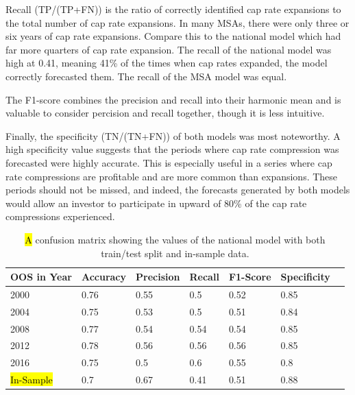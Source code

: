 \documentclass[jrfm,article,accept,oneauthor,pdftex]{Definitions/mdpi}
\begin{document}
Recall (TP/(TP+FN)) is the ratio of correctly identified cap rate expansions to the total number of cap rate expansions. In many MSAs, there were only three or six years of cap rate expansions. Compare this to the national model which had far more quarters of cap rate expansion. The recall of the national model was high at 0.41, meaning 41\% of the times when cap rates expanded, the model correctly forecasted them. The recall of the MSA model was equal.

The F1-score combines the precision and recall into their harmonic mean and is valuable to consider percision and recall together, though it is less intuitive. 

Finally, the specificity (TN/(TN+FN)) of both models was most noteworthy. A high specificity value suggests that the periods where cap rate compression was forecasted were highly accurate. This is especially useful in a series where cap rate compressions are profitable and are more common than expansions. These periods should not be missed, and indeed, the forecasts generated by both models would allow an investor to participate in upward of 80\% of the cap rate compressions experienced.


\begin{table}[H]
\tabcolsep=0.345cm
  \caption{\hl{A} %
 confusion matrix showing the values of the national model with both train/test split and in-sample data.}
    \begin{tabular}{lllllll}
    \toprule
    \textbf{OOS in Year }& {\textbf{Accuracy}} & {\textbf{Precision}} & {\textbf{Recall}} & {\textbf{F1-Score}} & {\textbf{Specificity}} &  \\
    \midrule
    {2000} & 0.76  & 0.55  & 0.5   & 0.52  & 0.85  &  \\
    {2004} & 0.75  & 0.53  & 0.5   & 0.51  & 0.84  &  \\
    {2008} & 0.77  & 0.54  & 0.54  & 0.54  & 0.85  &  \\
    {2012} & 0.78  & 0.56  & 0.56  & 0.56  & 0.85  &  \\
    {2016} & 0.75  & 0.5   & 0.6   & 0.55  & 0.8   &  \\
    \hl{In-Sample} %
 & 0.7   & 0.67  & 0.41  & 0.51  & 0.88  &  \\
    \bottomrule
    \end{tabular}%
  \label{tab:addlabel}%
\end{table}%
\unskip
\end{document}
